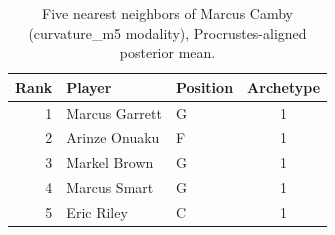 \begin{table}[htbp]
  \centering\small
  \begin{tabular}{rllc}
    \toprule
    Rank & Player & Position & Archetype \\
    \midrule
    1 & Marcus Garrett & G & 1 \\
    2 & Arinze Onuaku & F & 1 \\
    3 & Markel Brown & G & 1 \\
    4 & Marcus Smart & G & 1 \\
    5 & Eric Riley & C & 1 \\
    \bottomrule
  \end{tabular}
  \caption{Five nearest neighbors of Marcus Camby (curvature_m5 modality), Procrustes-aligned posterior mean.}
  \label{tab:Marcus_Camby_neighbors_curvature_m5}
\end{table}

